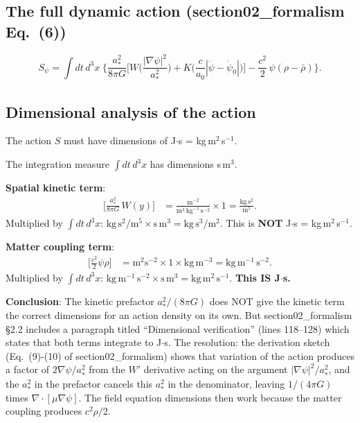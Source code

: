 \documentclass[11pt]{article}
\begin{document}
\subsection{The full dynamic action (section02\_formalism Eq.~(6))}

\begin{equation}
S_\psi = \int dt\,d^3x\;\Biggl\{
  \frac{a_*^2}{8\pi G}\biggl[
    W\!\biggl(\frac{|\nabla\psi|^2}{a_*^2}\biggr)
    + K\!\biggl(\frac{c}{a_0}|\dot\psi{-}\dot\psi_0|\biggr)
  \biggr]
  - \frac{c^2}{2}\,\psi(\rho - \bar\rho)
\Biggr\}.
\label{eq:full-action}
\end{equation}

\subsection{Dimensional analysis of the action}

The action $S$ must have dimensions of J$\cdot$s = kg\,m$^2$\,s$^{-1}$.

The integration measure $\int dt\,d^3x$ has dimensions s\,m$^3$.

\textbf{Spatial kinetic term}:
\begin{align}
\biggl[\frac{a_*^2}{8\pi G}\,W(y)\biggr]
&= \frac{\text{m}^{-2}}{\text{m}^3\,\text{kg}^{-1}\,\text{s}^{-2}} \times 1
= \frac{\text{kg}\,\text{s}^2}{\text{m}^5}.
\end{align}
Multiplied by $\int dt\,d^3x$: $\text{kg}\,\text{s}^2/\text{m}^5 \times
\text{s}\,\text{m}^3 = \text{kg}\,\text{s}^3/\text{m}^2$. This is
\textbf{NOT} J$\cdot$s = kg\,m$^2$\,s$^{-1}$.

\textbf{Matter coupling term}:
\begin{align}
\biggl[\frac{c^2}{2}\psi\rho\biggr]
&= \text{m}^2\text{s}^{-2} \times 1 \times \text{kg}\,\text{m}^{-3}
= \text{kg}\,\text{m}^{-1}\,\text{s}^{-2}.
\end{align}
Multiplied by $\int dt\,d^3x$: $\text{kg}\,\text{m}^{-1}\,\text{s}^{-2}
\times \text{s}\,\text{m}^3 = \text{kg}\,\text{m}^2\,\text{s}^{-1}$.
\textbf{This IS J$\cdot$s.} \checkmark

\textbf{Conclusion}: The kinetic prefactor $a_*^2/(8\pi G)$ does NOT
give the kinetic term the correct dimensions for an action density on
its own. But section02\_formalism \S2.2 includes a paragraph titled
``Dimensional verification'' (lines 118--128) which states that both
terms integrate to J$\cdot$s. The resolution: the derivation sketch
(Eq.~(9)-(10) of section02\_formalism) shows that variation of the
action produces a factor of $2\nabla\psi/a_*^2$ from the $W'$ derivative
acting on the argument $|\nabla\psi|^2/a_*^2$, and the $a_*^2$ in the
prefactor cancels this $a_*^2$ in the denominator, leaving $1/(4\pi G)$
times $\nabla\cdot[\mu\nabla\psi]$. The field equation dimensions then
work because the matter coupling produces $c^2\rho/2$.
\end{document}
